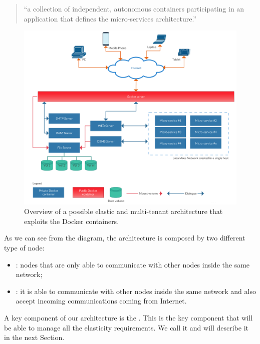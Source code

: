 \begin{center}
	\begin{quote}
		``a collection of independent, autonomous containers participating in an application that defines
		the micro-services architecture.''
	\end{quote}
\end{center}

\begin{figure}
	\centering{}
	\includegraphics[width=1.2\textwidth, angle=90]{chapters/architecture/images/architecture.png}
	\caption[Proposed architecture]{Overview of a possible elastic and multi-tenant architecture that
		exploits the Docker containers.}
	\label{img:architecture-proposal-architecture}
\end{figure}

As we can see from the diagram, the architecture is composed by two different type of node:

\begin{itemize}
	\item{: nodes that are only able to communicate with other nodes inside
		the same network;}
	\item{: it is able to communicate with other nodes inside the same network
		and also accept incoming communications coming from Internet.}
\end{itemize}

A key component of our architecture is the . This is the key component that will
be able to manage all the elasticity requirements. We call it  and will
describe it in the next Section.

